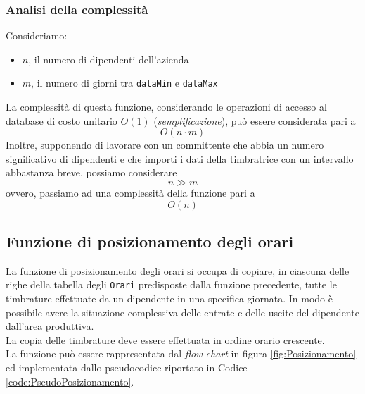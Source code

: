 \subsubsection{Analisi della complessità}
Consideriamo:
\begin{itemize}
	\item $n$, il numero di dipendenti dell'azienda
	\item $m$, il numero di giorni tra \verb|dataMin| e \verb|dataMax|
\end{itemize}
La complessità di questa funzione, considerando le operazioni di accesso al database di costo unitario $O(1)$ (\textit{semplificazione}), può essere considerata pari a
\begin{equation}
	O(n\cdot m)
\end{equation}
Inoltre, supponendo di lavorare con un committente che abbia un numero significativo di dipendenti e che importi i dati della timbratrice con un intervallo abbastanza breve, possiamo considerare
\begin{equation}
	n \gg m
\end{equation}
ovvero, passiamo ad una complessità della funzione pari a
\begin{equation}
	O(n)
\end{equation}
\subsection{Funzione di posizionamento degli orari}
La funzione di posizionamento degli orari si occupa di copiare, in ciascuna delle righe della tabella degli \verb|Orari| predisposte dalla funzione precedente, tutte le timbrature effettuate da un dipendente in una specifica giornata. In modo è possibile avere la situazione complessiva delle entrate e delle uscite del dipendente dall'area produttiva.\\
La copia delle timbrature deve essere effettuata in ordine orario crescente.\\

\noindent
La funzione può essere rappresentata dal \textit{flow-chart} in figura \ref{fig:Posizionamento} ed implementata dallo pseudocodice riportato in Codice \ref{code:PseudoPosizionamento}.



